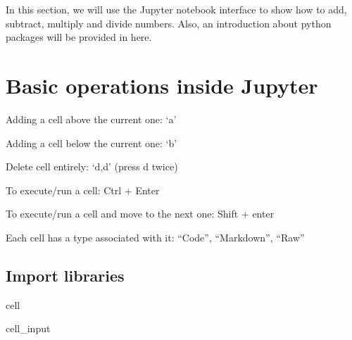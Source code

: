 \documentclass[letterpaper,10pt,english]{jupyterBook}
\begin{document}
\sphinxAtStartPar
In this section, we will use the Jupyter notebook interface to show how to add, subtract, multiply and divide numbers. Also, an introduction about python packages will be provided in here.

\sphinxstepscope


\chapter{Basic operations inside Jupyter}
\label{\detokenize{notebooks/getting_started/basic_math:basic-operations-inside-jupyter}}\label{\detokenize{notebooks/getting_started/basic_math::doc}}
\sphinxAtStartPar
Adding a cell above the current one: ‘a’

\sphinxAtStartPar
Adding a cell below the current one: ‘b’

\sphinxAtStartPar
Delete cell entirely: ‘d,d’ (press d twice)

\sphinxAtStartPar
To execute/run a cell: Ctrl + Enter

\sphinxAtStartPar
To execute/run a cell and move to the next one: Shift + enter

\sphinxAtStartPar
Each cell has a type associated with it: “Code”, “Markdown”, “Raw”


\section{Import libraries}
\label{\detokenize{notebooks/getting_started/basic_math:import-libraries}}
\begin{sphinxuseclass}{cell}\begin{sphinxVerbatimInput}

\begin{sphinxuseclass}{cell_input}
\begin{sphinxVerbatim}[commandchars=\\\{\}]
   
   
\end{sphinxVerbatim}

\end{sphinxuseclass}\end{sphinxVerbatimInput}

\end{sphinxuseclass}
\end{document}
